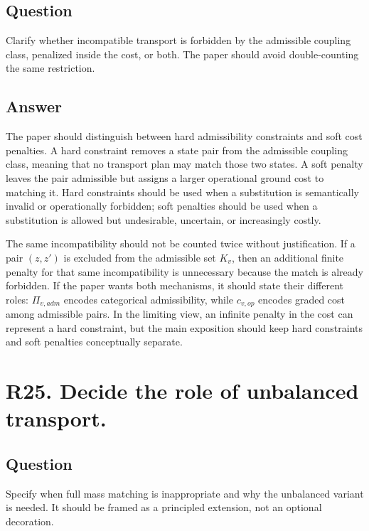 \documentclass[11pt,a4paper]{article}
\begin{document}
\subsection*{Question}

Clarify whether incompatible transport is forbidden by the admissible coupling class, penalized inside the cost, or both. The paper should avoid double-counting the same restriction.

\subsection*{Answer}

The paper should distinguish between hard admissibility constraints and soft cost penalties. A hard constraint removes a state pair from the admissible coupling class, meaning that no transport plan may match those two states. A soft penalty leaves the pair admissible but assigns a larger operational ground cost to matching it. Hard constraints should be used when a substitution is semantically invalid or operationally forbidden; soft penalties should be used when a substitution is allowed but undesirable, uncertain, or increasingly costly.

The same incompatibility should not be counted twice without justification. If a pair \((z,z')\) is excluded from the admissible set \(K_v\), then an additional finite penalty for that same incompatibility is unnecessary because the match is already forbidden. If the paper wants both mechanisms, it should state their different roles: \(\Pi_{v,adm}\) encodes categorical admissibility, while \(c_{v,op}\) encodes graded cost among admissible pairs. In the limiting view, an infinite penalty in the cost can represent a hard constraint, but the main exposition should keep hard constraints and soft penalties conceptually separate.

\section*{R25. Decide the role of unbalanced transport.}

\subsection*{Question}

Specify when full mass matching is inappropriate and why the unbalanced variant is needed. It should be framed as a principled extension, not an optional decoration.
\end{document}
